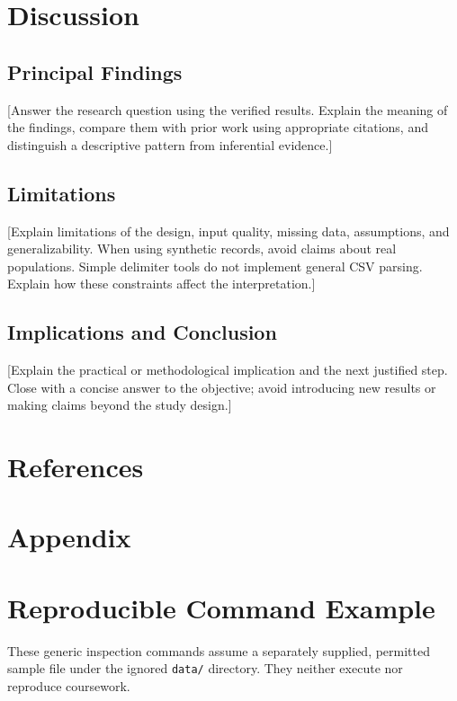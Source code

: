 \documentclass[12pt,letterpaper]{article}
\begin{document}
\section{Discussion}
\subsection{Principal Findings}
[Answer the research question using the verified results. Explain the meaning
of the findings, compare them with prior work using appropriate citations,
and distinguish a descriptive pattern from inferential evidence.]

\subsection{Limitations}
[Explain limitations of the design, input quality, missing data, assumptions,
and generalizability. When using synthetic records, avoid claims about real populations. Simple
delimiter tools do not implement general CSV parsing. Explain how these constraints affect the interpretation.]

\subsection{Implications and Conclusion}
[Explain the practical or methodological implication and the next justified
step. Close with a concise answer to the objective; avoid introducing new
results or making claims beyond the study design.]

\newpage
\section*{References}
\printbibliography[heading=none]

\newpage
\section*{Appendix}
\section*{Reproducible Command Example}
These generic inspection commands assume a separately supplied, permitted
sample file under the ignored \texttt{data/} directory. They neither execute
nor reproduce coursework.
\end{document}

